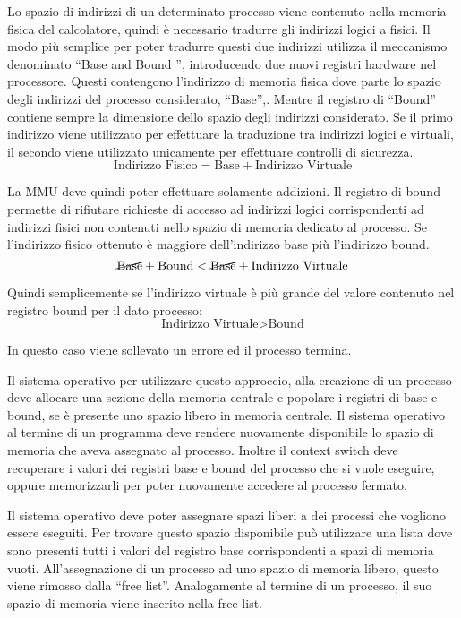 \documentclass{article}
\numberwithin{equation}{subsection}
\begin{document}
Lo spazio di indirizzi di un determinato processo viene contenuto nella memoria fisica del calcolatore, quindi è necessario tradurre gli indirizzi logici a fisici. 
Il modo più semplice per poter tradurre questi due indirizzi utilizza il meccanismo denominato ``Base and Bound '', introducendo due nuovi registri hardware nel 
processore. Questi contengono l'indirizzo di memoria fisica dove parte lo spazio degli indirizzi del processo considerato, ``Base'',. Mentre il registro di ``Bound'' 
contiene sempre la dimensione dello spazio degli indirizzi considerato. Se il primo indirizzo viene utilizzato per effettuare la traduzione tra indirizzi logici e 
virtuali, il secondo viene utilizzato unicamente per effettuare controlli di sicurezza. 
\begin{equation}
    \text{Indirizzo Fisico}=\text{Base}+\text{Indirizzo Virtuale}
\end{equation}

La MMU deve quindi poter effettuare solamente addizioni. Il registro di bound permette di rifiutare richieste di accesso ad indirizzi logici corrispondenti ad 
indirizzi fisici non contenuti nello spazio di memoria dedicato al processo. Se l'indirizzo fisico ottenuto è maggiore dell'indirizzo base più l'indirizzo bound. 
\begin{equation*}
    \cancel{\text{Base}}+\text{Bound}<\cancel{\text{Base}}+\text{Indirizzo Virtuale}
\end{equation*}

Quindi semplicemente se l'indirizzo virtuale è più grande del valore contenuto nel registro bound per il dato processo:
\begin{equation}
    \text{Indirizzo Virtuale}>\text{Bound}
\end{equation}

In questo caso viene sollevato un errore ed il processo termina. 

Il sistema operativo per utilizzare questo approccio, alla creazione di un processo deve allocare una sezione della memoria centrale e popolare i registri 
di base e bound, se è presente uno spazio libero in memoria centrale. 
Il sistema operativo al termine di un programma deve rendere nuovamente disponibile lo spazio di memoria che aveva assegnato al processo. Inoltre il context switch deve 
recuperare i valori dei registri base e bound del processo che si vuole eseguire, oppure memorizzarli per poter nuovamente accedere al processo fermato. 

Il sistema operativo deve poter assegnare spazi liberi a dei processi che vogliono essere eseguiti. Per trovare questo spazio disponibile può utilizzare una lista 
dove sono presenti tutti i valori del registro base corrispondenti a spazi di memoria vuoti. All'assegnazione di un processo ad uno spazio di memoria 
libero, questo viene rimosso dalla ``free list''. Analogamente al termine di un processo, il suo spazio di memoria viene inserito nella free list. 
\end{document}
